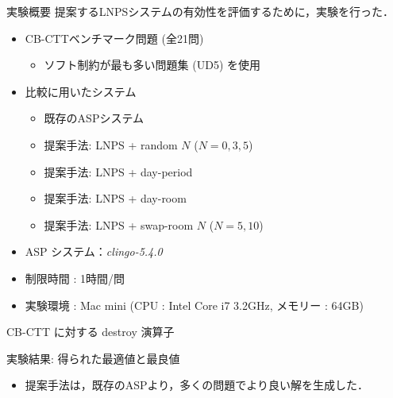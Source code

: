 \documentclass[11pt,dvipdfmx]{beamer}
\begin{document}
\begin{frame}{実験概要}
  提案するLNPSシステムの有効性を評価するために，実験を行った．
  \bigskip
  \begin{itemize}
  \item CB-CTTベンチマーク問題 (全21問)
    \begin{itemize}
    \item ソフト制約が最も多い問題集 (UD5) を使用
    \end{itemize}
  \item 比較に用いたシステム
    \begin{itemize}
    \item 既存のASPシステム{\clingo}
    \item 提案手法: LNPS + random $N$ ($N=0, 3, 5$)
    \item 提案手法: LNPS + day-period
    \item 提案手法: LNPS + day-room
    \item 提案手法: LNPS + swap-room $N$ ($N=5, 10$)
    \end{itemize}
  \item ASP システム：\textit{clingo-5.4.0}
  \item 制限時間 : 1時間/問
  \item 実験環境 : Mac mini (CPU : Intel Core i7 3.2GHz, メモリー : 64GB) 
  \end{itemize}
\end{frame}
\begin{frame}{CB-CTT に対する destroy 演算子}

\end{frame}
\begin{frame}{実験結果: 得られた最適値と最良値}
  \begin{tableA}
    
  \end{tableA}
  \begin{itemize}
  \item 提案手法は，既存のASPより，多くの問題でより良い解を生成した．
  \end{itemize}
\end{frame}
\end{document}
